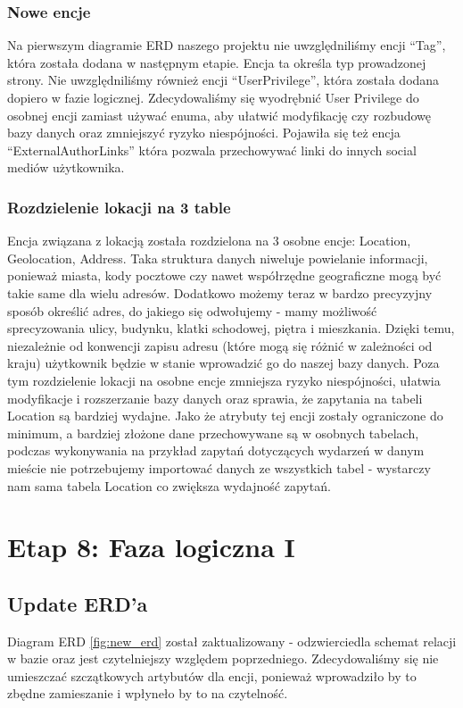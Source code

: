 \documentclass{article}
\begin{document}
\subsubsection{Nowe encje}
Na pierwszym diagramie ERD naszego projektu nie uwzględniliśmy encji “Tag”, która została dodana w następnym etapie. Encja ta określa typ prowadzonej strony. Nie uwzględniliśmy również encji “UserPrivilege”, która została dodana dopiero w fazie logicznej. Zdecydowaliśmy się wyodrębnić User Privilege do osobnej encji zamiast używać enuma, aby ułatwić modyfikację czy rozbudowę bazy danych oraz zmniejszyć ryzyko niespójności. 
Pojawiła się też encja “ExternalAuthorLinks” która pozwala przechowywać linki do innych social mediów użytkownika. 


\subsubsection{Rozdzielenie lokacji na 3 table}
Encja związana z lokacją została rozdzielona na 3 osobne encje: Location, Geolocation, Address. Taka struktura danych niweluje powielanie informacji, ponieważ miasta, kody pocztowe czy nawet współrzędne geograficzne mogą być takie same dla wielu adresów. Dodatkowo możemy teraz w bardzo precyzyjny sposób określić adres, do jakiego się odwołujemy -  mamy możliwość sprecyzowania ulicy, budynku, klatki schodowej, piętra i mieszkania. Dzięki temu, niezależnie od konwencji zapisu adresu (które mogą się różnić w zależności od kraju) użytkownik będzie w stanie wprowadzić go do naszej bazy danych. 
Poza tym rozdzielenie lokacji na osobne encje zmniejsza ryzyko niespójności, ułatwia modyfikacje i rozszerzanie bazy danych oraz sprawia, że zapytania na tabeli Location są bardziej wydajne. Jako że atrybuty tej encji zostały ograniczone do minimum, a bardziej złożone dane przechowywane są w osobnych tabelach, podczas wykonywania na przykład zapytań dotyczących wydarzeń w danym mieście nie potrzebujemy importować danych ze wszystkich tabel - wystarczy nam sama tabela Location co zwiększa wydajność zapytań.


\section{Etap 8: Faza logiczna I}

\subsection{Update ERD'a}

Diagram ERD \ref{fig:new_erd} został zaktualizowany - odzwierciedla schemat relacji w bazie oraz jest czytelniejszy względem poprzedniego. Zdecydowaliśmy się nie umieszczać szczątkowych artybutów dla encji, ponieważ wprowadziło by to zbędne zamieszanie i wpłyneło by to na czytelność. 
\end{document}
